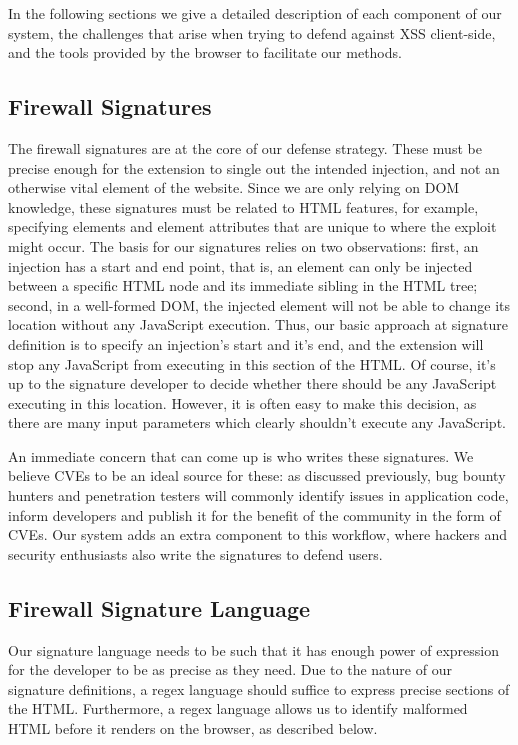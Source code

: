 In the following sections we give a detailed description of each component of our system, the challenges that arise when trying to defend against XSS client-side, and the tools provided by the browser to facilitate our methods. 
 
 \subsection{Firewall Signatures}
	 The firewall signatures are at the core of our defense strategy. These must be precise enough for the extension to single out the intended injection, and not an otherwise vital element of the website. Since we are only relying on DOM knowledge, these signatures must be related to HTML features, for example, specifying elements and element attributes that are unique to where the exploit might occur. The basis for our signatures relies on two observations: first, an injection has a start and end point, that is, an element can only be injected between a specific HTML node and its immediate sibling in the HTML tree; second, in a well-formed DOM, the injected element will not be able to change its location without any JavaScript execution. Thus, our basic approach at signature definition is to specify an injection's start and it's end, and the extension will stop any JavaScript from executing in this section of the HTML. Of course, it's up to the signature developer to decide whether there should be any JavaScript executing in this location. However, it is often easy to make this decision, as there are many input parameters which clearly shouldn't execute any JavaScript.
	 
	An immediate concern that can come up is who writes these signatures. We believe CVEs to be an ideal source for these: as discussed previously, bug bounty hunters and penetration testers will commonly identify issues in application code, inform developers and publish it for the benefit of the community in the form of CVEs. Our system adds an extra component to this workflow, where hackers and security enthusiasts also write the signatures to defend users.
 
 \subsection{Firewall Signature Language}
 Our signature language needs to be such that it has enough power of expression for the developer to be as precise as they need. Due to the nature of our signature definitions, a regex language should suffice to express precise sections of the HTML. Furthermore, a regex language allows us to identify malformed HTML before it renders on the browser, as described below.
 
